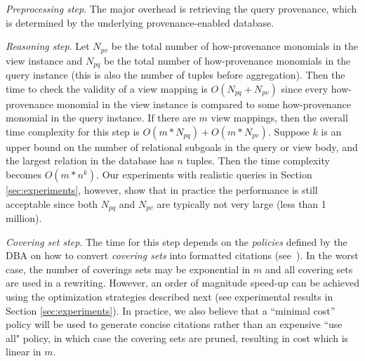 {\em Preprocessing step}.  The major overhead is retrieving the query provenance, which is determined by the underlying provenance-enabled database. 

{\em Reasoning step}. 
Let $N_{pv}$ be the total number of how-provenance monomials in the view instance and $N_{pq}$ be the total number of how-provenance monomials in the query instance (this is also the number of tuples before aggregation).  Then the time to check the validity of a view mapping is $O(N_{pq} + N_{pv})$ since every how-provenance monomial in the view instance is compared to some how-provenance monomial in the query instance. 
If there are $m$ view mappings, then the overall time complexity for this step is $O(m*N_{pq}) + O(m*N_{pv})$.
Suppose $k$ is an upper bound on the number of relational subgoals in the query or view body, and the largest relation in the database has $n$ tuples.
Then the time complexity becomes $O(m*n^k)$.  Our experiments with realistic queries in Section \ref{sec:experiments}\eat{~\ref{ssec: realistic}}, however, show that in practice the performance is still acceptable since both $N_{pq}$ and $N_{pv}$ are typically not very large (less than 1 million).


{\em Covering set step}.  The time for this step depends on the {\em policies} defined by the DBA on how to convert {\em covering sets} into formatted citations
(see~\cite{wu2018data}).  
In the worst case, the number of coverings sets may be exponential in $m$ and all covering sets are used in a rewriting. However, an order of magnitude speed-up can be achieved using the optimization strategies described  next (see experimental results in Section \ref{sec:experiments}).
In practice, we also believe that a ``minimal cost'' policy will be used to generate concise citations rather than an expensive ``use all" policy, in which case the covering sets are pruned, resulting in cost which is linear in $m$.



